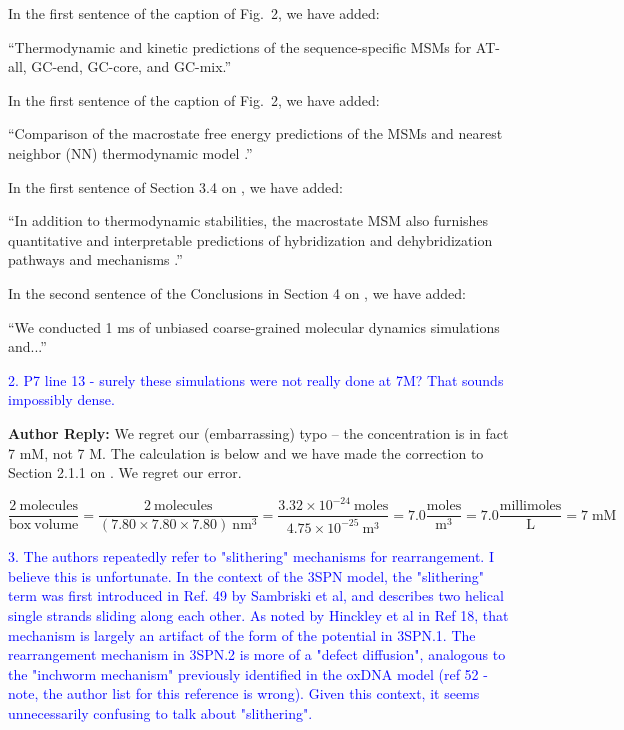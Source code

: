 \documentclass[11pt,a4paper]{letter} %
\newcommand*{\rood}[1]{{\color{red}{#1}}}
\begin{document}
In the first sentence of the caption of Fig.~2, we have added:

``Thermodynamic and kinetic predictions of the sequence-specific MSMs \rood{fitted at the sequence melting temperatures} for AT-all, GC-end, GC-core, and GC-mix.''

In the first sentence of the caption of Fig.~2, we have added:

``Comparison of the macrostate free energy predictions of the MSMs and nearest neighbor (NN) thermodynamic model \rood{at the sequence melting temperatures}.''

In the first sentence of Section 3.4 on \rood{p.~24}, we have added:

``In addition to thermodynamic stabilities, the macrostate MSM also furnishes quantitative and interpretable predictions of hybridization and dehybridization pathways and mechanisms \rood{at the sequence melting temperatures}.''

In the second sentence of the Conclusions in Section 4 on \rood{p.~33}, we have added:

``We conducted 1 ms of unbiased coarse-grained molecular dynamics simulations \rood{at the melting temperature of each sequence} and...''






\textcolor{blue}{2. P7 line 13 - surely these simulations were not really done at 7M? That sounds impossibly dense.}

\textbf{Author Reply:}   We regret our (embarrassing) typo -- the concentration is in fact 7 mM, not 7 M. The calculation is below and we have made the correction to Section 2.1.1 on \rood{p.~7}. We regret our error.

\begin{equation}\label{}
\frac{2 \mathrm{\:molecules}}{\mathrm{box\:volume}} = \frac{2 \mathrm{\:molecules}}{(7.80 \times 7.80 \times 7.80) \mathrm{\:nm}^3} = \frac{3.32 \times 10^{-24} \mathrm{\:moles}}{4.75 \times 10^{-25} \mathrm{\:m}^3} = 7.0 \frac{\mathrm{moles}}{\mathrm{m}^3} = 7.0 \frac{\mathrm{millimoles}}{\mathrm{L}} = 7 \; \mathrm{mM}
\end{equation}





\textcolor{blue}{3.  The authors repeatedly refer to "slithering" mechanisms for rearrangement. I believe this is unfortunate. In the context of the 3SPN model, the "slithering" term was first introduced in Ref. 49 by Sambriski et al, and describes two helical single strands sliding along each other. As noted by Hinckley et al in Ref 18, that mechanism is largely an artifact of the form of the potential in 3SPN.1. The rearrangement mechanism in 3SPN.2 is more of a "defect diffusion", analogous to the "inchworm mechanism" previously identified in the oxDNA model (ref 52 - note, the author list for this reference is wrong). Given this context, it seems unnecessarily confusing to talk about "slithering".}
\end{document}
